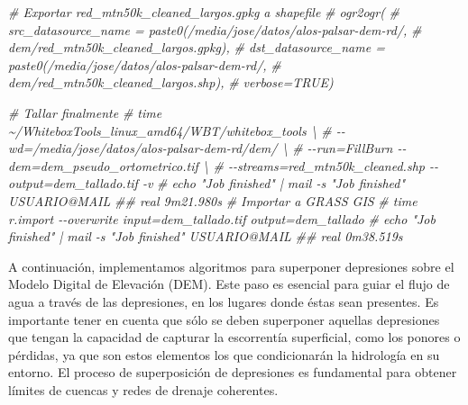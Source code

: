 \documentclass[spanish]{article}
\newenvironment{Shaded}{\begin{snugshade}}{\end{snugshade}}
\newcommand{\CommentTok}[1]{\textcolor[rgb]{0.56,0.35,0.01}{\textit{#1}}}
\begin{document}
\begin{Shaded}
\begin{Highlighting}[]
\CommentTok{\# Exportar red\_mtn50k\_cleaned\_largos.gpkg a shapefile}
\CommentTok{\# ogr2ogr(}
\CommentTok{\#   src\_datasource\_name = paste0(\textquotesingle{}/media/jose/datos/alos{-}palsar{-}dem{-}rd/\textquotesingle{},}
\CommentTok{\#                                \textquotesingle{}dem/red\_mtn50k\_cleaned\_largos.gpkg\textquotesingle{}),}
\CommentTok{\#   dst\_datasource\_name = paste0(\textquotesingle{}/media/jose/datos/alos{-}palsar{-}dem{-}rd/\textquotesingle{},}
\CommentTok{\#                                \textquotesingle{}dem/red\_mtn50k\_cleaned\_largos.shp\textquotesingle{}),}
\CommentTok{\#   verbose=TRUE)}
\end{Highlighting}
\end{Shaded}

\begin{Shaded}
\begin{Highlighting}[]
\CommentTok{\# Tallar finalmente}
\CommentTok{\# time \textasciitilde{}/WhiteboxTools\_linux\_amd64/WBT/whitebox\_tools \textbackslash{}}
\CommentTok{\#   {-}{-}wd=\textquotesingle{}/media/jose/datos/alos{-}palsar{-}dem{-}rd/dem/\textquotesingle{} \textbackslash{}}
\CommentTok{\#   {-}{-}run=FillBurn {-}{-}dem=\textquotesingle{}dem\_pseudo\_ortometrico.tif\textquotesingle{} \textbackslash{}}
\CommentTok{\#   {-}{-}streams=red\_mtn50k\_cleaned.shp {-}{-}output=\textquotesingle{}dem\_tallado.tif\textquotesingle{} {-}v}
\CommentTok{\# echo "Job finished" | mail {-}s "Job finished" USUARIO@MAIL}
\CommentTok{\#\# real 9m21.980s}
\CommentTok{\# Importar a GRASS GIS}
\CommentTok{\# time r.import {-}{-}overwrite input=dem\_tallado.tif output=dem\_tallado}
\CommentTok{\# echo "Job finished" | mail {-}s "Job finished" USUARIO@MAIL}
\CommentTok{\#\# real 0m38.519s}
\end{Highlighting}
\end{Shaded}

A continuación, implementamos algoritmos para superponer depresiones
sobre el Modelo Digital de Elevación (DEM). Este paso es esencial para
guiar el flujo de agua a través de las depresiones, en los lugares donde
éstas sean presentes. Es importante tener en cuenta que sólo se deben
superponer aquellas depresiones que tengan la capacidad de capturar la
escorrentía superficial, como los ponores o pérdidas, ya que son estos
elementos los que condicionarán la hidrología en su entorno. El proceso
de superposición de depresiones es fundamental para obtener límites de
cuencas y redes de drenaje coherentes.
\end{document}
